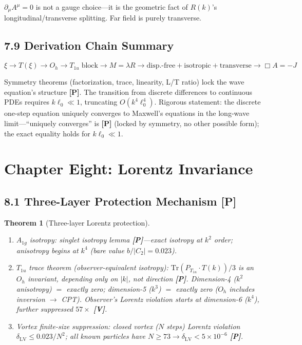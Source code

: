 \documentclass[11pt,a4paper]{article}
\newtheorem{theorem}{Theorem}[section]
\newcommand{\gradeP}{\textbf{[P]}}
\newcommand{\gradeV}{\textbf{[V]}}
\begin{document}
$\partial_\mu A^\mu = 0$ is not a gauge choice---it is the geometric fact of $R(k)$'s longitudinal/transverse splitting. Far field is purely transverse.

\subsection{7.9 Derivation Chain Summary}

\[
\xi\to T(\xi)\to O_h\to T_{1u}\;\text{block}\to M=\lambda R\to\text{disp.-free}+\text{isotropic}+\text{transverse}\to\Box A=-J
\]

Symmetry theorems (factorization, trace, linearity, L/T ratio) lock the wave equation's structure \gradeP. The transition from discrete differences to continuous PDEs requires $k\ell_0\ll 1$, truncating $O(k^4\ell_0^4)$. Rigorous statement: the discrete one-step equation uniquely converges to Maxwell's equations in the long-wave limit---``uniquely converges'' is \gradeP{} (locked by symmetry, no other possible form); the exact equality holds for $k\ell_0\ll 1$.

\section{Chapter Eight: Lorentz Invariance}\label{sec:ch8}

\subsection{8.1 Three-Layer Protection Mechanism \gradeP}

\begin{theorem}[Three-layer Lorentz protection]\label{thm:lorentz}~
\begin{enumerate}[nosep]
\item $A_{1g}$ isotropy: singlet isotropy lemma \gradeP---exact isotropy at $k^2$ order; anisotropy begins at $k^4$ (bare value $b/|C_2|=0.023$).
\item $T_{1u}$ trace theorem (observer-equivalent isotropy): $\mathrm{Tr}(P_{T_{1u}}\cdot T(k))/3$ is an $O_h$ invariant, depending only on $|k|$, not direction \gradeP. Dimension-4 ($k^2$ anisotropy) $=$ exactly zero; dimension-5 ($k^3$) $=$ exactly zero ($O_h$ includes inversion $\to$ CPT). Observer's Lorentz violation starts at dimension-6 ($k^4$), further suppressed $57\times$ \gradeV.
\item Vortex finite-size suppression: closed vortex ($N$ steps) Lorentz violation $\delta_{\mathrm{LV}}\leq 0.023/N^2$; all known particles have $N\geq 73\to\delta_{\mathrm{LV}}<5\times 10^{-6}$ \gradeP.
\end{enumerate}
\end{theorem}
\end{document}
